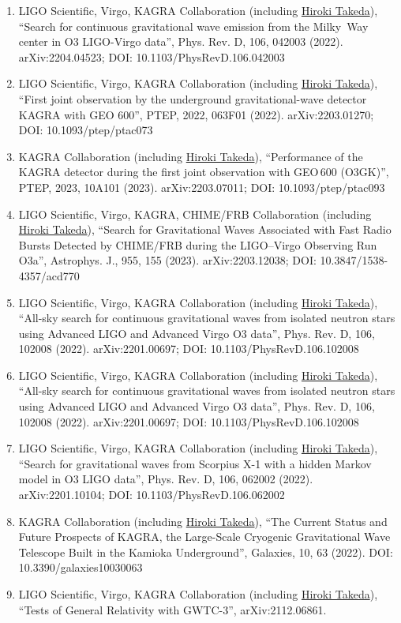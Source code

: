 \documentclass[uplatex, 11pt]{jsarticle}
\begin{document}
\begin{enumerate}
\item LIGO Scientific, Virgo, KAGRA Collaboration (including \uline{Hiroki Takeda}), “Search for continuous gravitational wave emission from the Milky~Way center in O3 LIGO-Virgo data”, Phys. Rev. D, 106, 042003 (2022). arXiv:2204.04523; DOI: 10.1103/PhysRevD.106.042003
\item LIGO Scientific, Virgo, KAGRA Collaboration (including \uline{Hiroki Takeda}), “First joint observation by the underground gravitational-wave detector KAGRA with GEO 600”, PTEP, 2022, 063F01 (2022). arXiv:2203.01270; DOI: 10.1093/ptep/ptac073
\item KAGRA Collaboration (including \uline{Hiroki Takeda}), “Performance of the KAGRA detector during the first joint observation with GEO\,600 (O3GK)”, PTEP, 2023, 10A101 (2023). arXiv:2203.07011; DOI: 10.1093/ptep/ptac093
\item LIGO Scientific, Virgo, KAGRA, CHIME/FRB Collaboration (including \uline{Hiroki Takeda}), “Search for Gravitational Waves Associated with Fast Radio Bursts Detected by CHIME/FRB during the LIGO–Virgo Observing Run O3a”, Astrophys. J., 955, 155 (2023). arXiv:2203.12038; DOI: 10.3847/1538-4357/acd770
\item LIGO Scientific, Virgo, KAGRA Collaboration (including \uline{Hiroki Takeda}), “All-sky search for continuous gravitational waves from isolated neutron stars using Advanced LIGO and Advanced Virgo O3 data”, Phys. Rev. D, 106, 102008 (2022). arXiv:2201.00697; DOI: 10.1103/PhysRevD.106.102008
\item LIGO Scientific, Virgo, KAGRA Collaboration (including \uline{Hiroki Takeda}), “All-sky search for continuous gravitational waves from isolated neutron stars using Advanced LIGO and Advanced Virgo O3 data”, Phys. Rev. D, 106, 102008 (2022). arXiv:2201.00697; DOI: 10.1103/PhysRevD.106.102008
\item LIGO Scientific, Virgo, KAGRA Collaboration (including \uline{Hiroki Takeda}), “Search for gravitational waves from Scorpius X-1 with a hidden Markov model in O3 LIGO data”, Phys. Rev. D, 106, 062002 (2022). arXiv:2201.10104; DOI: 10.1103/PhysRevD.106.062002
\item KAGRA Collaboration (including \uline{Hiroki Takeda}), “The Current Status and Future Prospects of KAGRA, the Large-Scale Cryogenic Gravitational Wave Telescope Built in the Kamioka Underground”, Galaxies, 10, 63 (2022). DOI: 10.3390/galaxies10030063
\item LIGO Scientific, Virgo, KAGRA Collaboration (including \uline{Hiroki Takeda}), “Tests of General Relativity with GWTC-3”, arXiv:2112.06861.

\end{enumerate}
\end{document}
